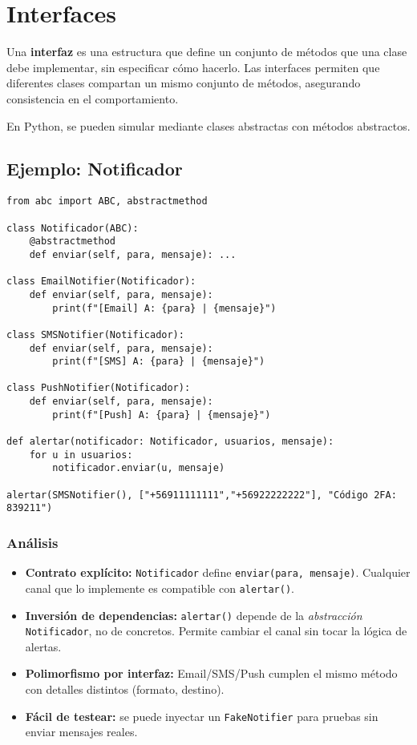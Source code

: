 \documentclass[12pt,a4paper]{article}
\begin{document}
\section{Interfaces}
Una \textbf{interfaz} es una estructura que define un conjunto de métodos que una clase debe implementar, sin especificar cómo hacerlo.  
Las interfaces permiten que diferentes clases compartan un mismo conjunto de métodos, asegurando consistencia en el comportamiento.

En Python, se pueden simular mediante clases abstractas con métodos abstractos.

\subsection*{Ejemplo: Notificador}
\begin{lstlisting}
from abc import ABC, abstractmethod

class Notificador(ABC):
    @abstractmethod
    def enviar(self, para, mensaje): ...

class EmailNotifier(Notificador):
    def enviar(self, para, mensaje):
        print(f"[Email] A: {para} | {mensaje}")

class SMSNotifier(Notificador):
    def enviar(self, para, mensaje):
        print(f"[SMS] A: {para} | {mensaje}")

class PushNotifier(Notificador):
    def enviar(self, para, mensaje):
        print(f"[Push] A: {para} | {mensaje}")

def alertar(notificador: Notificador, usuarios, mensaje):
    for u in usuarios:
        notificador.enviar(u, mensaje)

alertar(SMSNotifier(), ["+56911111111","+56922222222"], "Código 2FA: 839211")
\end{lstlisting}

\subsubsection*{Análisis}
\begin{itemize}
    \item \textbf{Contrato explícito:} \texttt{Notificador} define \texttt{enviar(para, mensaje)}. Cualquier canal que lo implemente es compatible con \texttt{alertar()}.
    \item \textbf{Inversión de dependencias:} \texttt{alertar()} depende de la \emph{abstracción} \texttt{Notificador}, no de concretos. Permite cambiar el canal sin tocar la lógica de alertas.
    \item \textbf{Polimorfismo por interfaz:} Email/SMS/Push cumplen el mismo método con detalles distintos (formato, destino).
    \item \textbf{Fácil de testear:} se puede inyectar un \texttt{FakeNotifier} para pruebas sin enviar mensajes reales.
\end{itemize}
\end{document}
